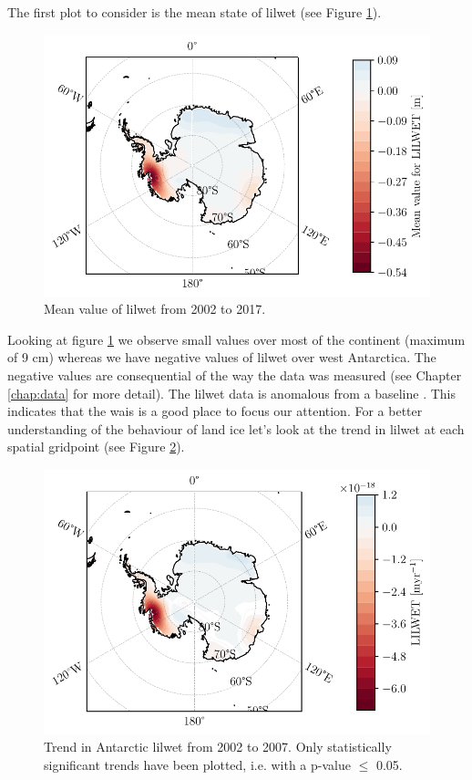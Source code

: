 \documentclass[../main.tex]{subfiles}
\begin{document}
The first plot to consider is the mean state of \gls{lilwet} (see Figure \ref{fig:lilwet_mean}).
 \begin{figure}[hbt!]
     \centering
     \includegraphics{images/T2/mean_spatial/hres/LIC}
     \caption{Mean value of \gls{lilwet} from 2002 to 2017.}
     \label{fig:lilwet_mean}
 \end{figure}
 Looking at figure \ref{fig:lilwet_mean} we observe small values over most of the continent (maximum of 9 cm) whereas we have negative values of \gls{lilwet} over west Antarctica. The negative values are consequential of the way the data was measured (see Chapter \ref{chap:data} for more detail). The \gls{lilwet} data is anomalous from a baseline . This indicates that the \gls{wais} is a good place to focus our attention. For a better understanding of the behaviour of land ice let's look at the trend in \gls{lilwet} at each spatial gridpoint (see Figure \ref{fig:lilwet_trend}).
\begin{figure}[hbt!]
    \centering
    \includegraphics{images/T2/trends/hres/LIC_0.05.pdf}
    \caption{Trend in Antarctic \gls{lilwet} from 2002 to 2007. Only statistically significant trends have been plotted, i.e. with a p-value $\leq$ 0.05.}
    \label{fig:lilwet_trend}
\end{figure}
\end{document}
